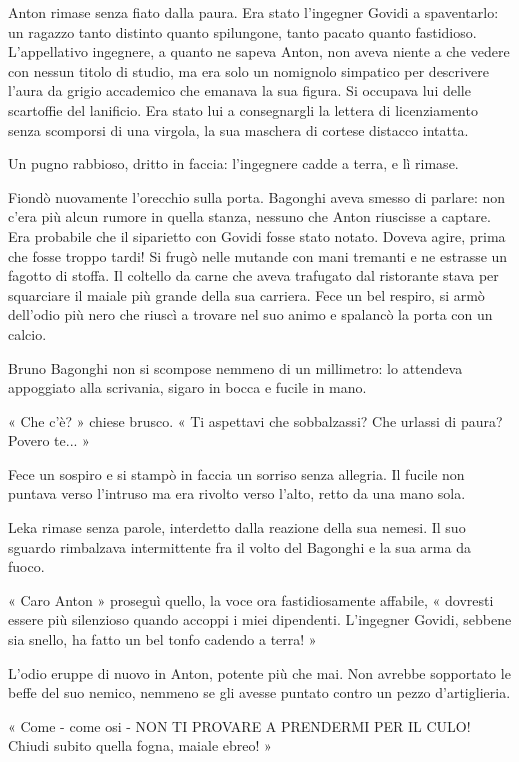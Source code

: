Anton rimase senza fiato dalla paura. Era stato l'ingegner Govidi a spaventarlo: un ragazzo tanto distinto quanto spilungone, tanto pacato quanto fastidioso. L'appellativo ingegnere, a quanto ne sapeva Anton, non aveva niente a che vedere con nessun titolo di studio, ma era solo un nomignolo simpatico per descrivere l'aura da grigio accademico che emanava la sua figura. Si occupava lui delle scartoffie del lanificio. Era stato lui a consegnargli la lettera di licenziamento senza scomporsi di una virgola, la sua maschera di cortese distacco intatta.

Un pugno rabbioso, dritto in faccia: l'ingegnere cadde a terra, e lì rimase.

Fiondò nuovamente l'orecchio sulla porta. Bagonghi aveva smesso di parlare: non c'era più alcun rumore in quella stanza, nessuno che Anton riuscisse a captare. Era probabile che il siparietto con Govidi fosse stato notato. Doveva agire, prima che fosse troppo tardi! Si frugò nelle mutande con mani tremanti e ne estrasse un fagotto di stoffa. Il coltello da carne che aveva trafugato dal ristorante stava per squarciare il maiale più grande della sua carriera. Fece un bel respiro, si armò dell'odio più nero che riuscì a trovare nel suo animo e spalancò la porta con un calcio.

Bruno Bagonghi non si scompose nemmeno di un millimetro: lo attendeva appoggiato alla scrivania, sigaro in bocca e fucile in mano.

« Che c'è? » chiese brusco. « Ti aspettavi che sobbalzassi? Che urlassi di paura? Povero te... »

Fece un sospiro e si stampò in faccia un sorriso senza allegria. Il fucile non puntava verso l'intruso ma era rivolto verso l'alto, retto da una mano sola.

Leka rimase senza parole, interdetto dalla reazione della sua nemesi. Il suo sguardo rimbalzava intermittente fra il volto del Bagonghi e la sua arma da fuoco.

« Caro Anton » proseguì quello, la voce ora fastidiosamente affabile, « dovresti essere più silenzioso quando accoppi i miei dipendenti. L'ingegner Govidi, sebbene sia snello, ha fatto un bel tonfo cadendo a terra! »

L'odio eruppe di nuovo in Anton, potente più che mai. Non avrebbe sopportato le beffe del suo nemico, nemmeno se gli avesse puntato contro un pezzo d'artiglieria.

« Come - come osi - NON TI PROVARE A PRENDERMI PER IL CULO! Chiudi subito quella fogna, maiale ebreo! »

